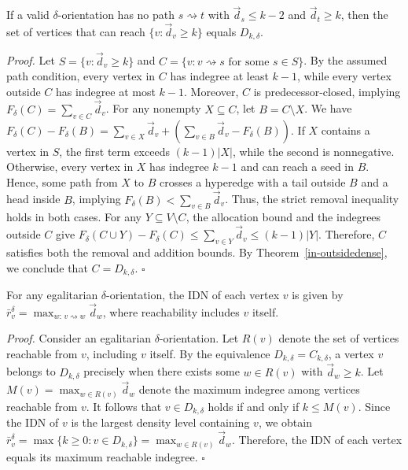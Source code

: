 \documentclass[twocolumn]{svjour3}
\begin{document}
\begin{lemma}\label{lem:kstable}
If a valid $\delta$-orientation has no path $s\rightsquigarrow t$ with $\vec d_s\le k-2$ and $\vec d_t\ge k$, then the set of vertices that can reach $\{v:\vec d_v\ge k\}$ equals $D_{k,\delta}$.
\end{lemma}
\emph{Proof.}
Let $S=\{v:\vec d_v\ge k\}$ and $C=\{v:v\rightsquigarrow s\text{ for some }s\in S\}$. By the assumed path condition, every vertex in $C$ has indegree at least $k-1$, while every vertex outside $C$ has indegree at most $k-1$. Moreover, $C$ is predecessor-closed, implying $F_\delta(C)=\sum_{v\in C}\vec d_v$.
For any nonempty $X\subseteq C$, let $B=C\setminus X$. We have
$F_\delta(C)-F_\delta(B)
=\sum_{v\in X}\vec d_v+
\left(\sum_{v\in B}\vec d_v-F_\delta(B)\right)$.
If $X$ contains a vertex in $S$, the first term exceeds $(k-1)|X|$, while the second is nonnegative. Otherwise, every vertex in $X$ has indegree $k-1$ and can reach a seed in $B$. Hence, some path from $X$ to $B$ crosses a hyperedge with a tail outside $B$ and a head inside $B$, implying $F_\delta(B)<\sum_{v\in B}\vec d_v$. Thus, the strict removal inequality holds in both cases.
For any $Y\subseteq V\setminus C$, the allocation bound and the indegrees outside $C$ give
$F_\delta(C\cup Y)-F_\delta(C)
\le \sum_{v\in Y}\vec d_v
\le (k-1)|Y|$.
Therefore, $C$ satisfies both the removal and addition bounds. By Theorem~\ref{in-outsidedense}, we conclude that $C=D_{k,\delta}$.
\hfill$\square$

\begin{theorem}\label{thm:idn-reach}
For any egalitarian $\delta$-orientation, the IDN of each vertex $v$ is given by
$\bar r_v^\delta=\max_{w:\,v\rightsquigarrow w}\vec d_w$,
where reachability includes $v$ itself.
\end{theorem}


\emph{Proof.}
Consider an egalitarian $\delta$-orientation. Let $R(v)$ denote
the set of vertices reachable from $v$, including $v$ itself.
By the equivalence $D_{k,\delta}=C_{k,\delta}$, a vertex $v$
belongs to $D_{k,\delta}$ precisely when there exists some
$w\in R(v)$ with $\vec d_w\ge k$.
Let $M(v)=\max_{w\in R(v)}\vec d_w$ denote the maximum
indegree among vertices reachable from $v$. It follows that
$v\in D_{k,\delta}$ holds if and only if $k\le M(v)$.
Since the IDN of $v$ is the largest density level containing
$v$, we obtain
$\bar r_v^\delta
=\max\{k\ge 0:v\in D_{k,\delta}\}
=\max_{w\in R(v)}\vec d_w$.
Therefore, the IDN of each vertex equals its maximum
reachable indegree.
\hfill$\square$
\end{document}

